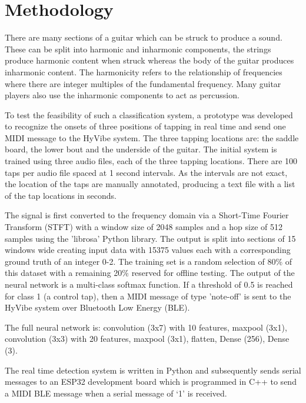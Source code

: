 \documentclass[conference]{IEEEtran}
\begin{document}
\section{Methodology}
There are many sections of a guitar which can be struck to produce a sound. These can be split into harmonic and inharmonic components, the strings produce harmonic content when
struck whereas the body of the guitar produces inharmonic content. The harmonicity refers to the relationship of frequencies where there are integer multiples of the fundamental frequency.
Many guitar players also use the inharmonic components to act as percussion. 

To test the feasibility of such a classification system, a prototype was developed to recognize the onsets of three positions of tapping in real time and send one MIDI message to the HyVibe system.
The three tapping locations are: the saddle board, the lower bout and the underside of the guitar.
The initial system is trained using three audio files, each of the three tapping locations. There are 100 taps per audio file spaced at 1 second intervals. As the intervals are not
exact, the location of the taps are manually annotated, producing a text file with a list of the tap locations in seconds.

The signal is first converted to the frequency domain via a Short-Time Fourier Transform (STFT) with a window size of 2048 samples and a hop size of 512 samples using the 'librosa' Python library. The output is split
into sections of 15 windows wide creating input data with 15375 values each with a corresponding ground truth of an integer 0-2. The training set is a random selection of 80\% of this dataset with a remaining 20\% reserved for offline testing. 
The output of the neural network is a multi-class softmax function. If a threshold of 0.5 is reached for class 1 (a control tap), then a MIDI message of type 'note-off' is sent to the HyVibe system over 
Bluetooth Low Energy (BLE).

The full neural network is: convolution (3x7) with 10 features, maxpool (3x1), convolution (3x3) with 20 features, maxpool (3x1), flatten, Dense (256), Dense (3).

The real time detection system is written in Python and subsequently sends serial messages to an ESP32 development board which is programmed in C++ to send a MIDI BLE message when a serial
message of `1' is received.
\end{document}
